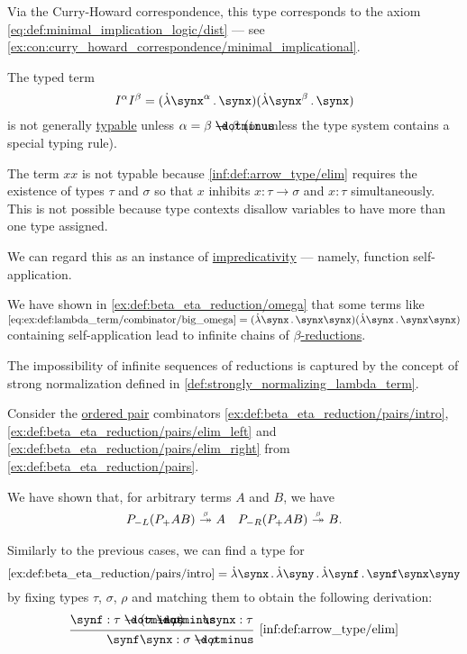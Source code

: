 \begin{example}
\begin{thmenum}
    Via the Curry-Howard correspondence, this type corresponds to the axiom \eqref{eq:def:minimal_implication_logic/dist} --- see \cref{ex:con:curry_howard_correspondence/minimal_implicational}.

     The typed term
    \begin{equation*}
      I^\alpha I^\beta = (\qabs {\synx^\alpha} \synx) (\qabs {\synx^\beta} \synx)
    \end{equation*}
    is not generally \hyperref[def:typability]{typable} unless \( \alpha = \beta \synimplies \beta \) (or unless the type system contains a special typing rule).

     The term \( xx \) is not typable because \ref{inf:def:arrow_type/elim} requires the existence of types \( \tau \) and \( \sigma \) so that \( x \) inhibits \( x: \tau \to \sigma \) and \( x: \tau \) simultaneously. This is not possible because type contexts disallow variables to have more than one type assigned.

    We can regard this as an instance of \hyperref[con:impredicativity]{impredicativity} --- namely, function self-application.

    We have shown in \cref{ex:def:beta_eta_reduction/omega} that some terms like \( \ref{eq:ex:def:lambda_term/combinator/big_omega} = (\qabs \synx \synx \synx) (\qabs \synx \synx \synx) \) containing self-application lead to infinite chains of \hyperref[def:beta_eta_reduction]{\( \beta \)-reductions}.

    The impossibility of infinite sequences of reductions is captured by the concept of strong normalization defined in \cref{def:strongly_normalizing_lambda_term}.

     Consider the \hyperref[def:ordered_tuple]{ordered pair} combinators \ref{ex:def:beta_eta_reduction/pairs/intro}, \ref{ex:def:beta_eta_reduction/pairs/elim_left} and \ref{ex:def:beta_eta_reduction/pairs/elim_right} from \cref{ex:def:beta_eta_reduction/pairs}.

    We have shown that, for arbitrary terms \( A \) and \( B \), we have
    \begin{align*}
      P_{-L} (P_+ A B) \bred* A
      &&
      P_{-R} (P_+ A B) \bred* B.
    \end{align*}

    Similarly to the previous cases, we can find a type for
    \begin{equation*}
      \ref{ex:def:beta_eta_reduction/pairs/intro} = \qabs \synx \qabs \syny \qabs \synf \synf \synx \syny
    \end{equation*}
    by fixing types \( \tau \), \( \sigma \), \( \rho \) and matching them to obtain the following derivation:
    \begin{equation*}
      \begin{prooftree}
        \hypo{ \synf: \tau \synimplies (\sigma \synimplies \rho) }
        \hypo{ \synx: \tau }
        \infer2[\ref{inf:def:arrow_type/elim}]{ \synf \synx: \sigma \synimplies \rho }


\end{prooftree}
\end{equation*}
\end{thmenum}
\end{example}
